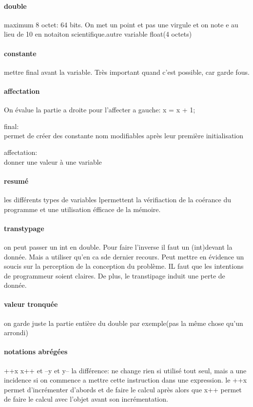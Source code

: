 \documentclass[a4paper,10pt]{article}
\begin{document}
\paragraph{double}
maximum 8 octet: 64 bits. On met un point et pas une virgule et on note e au lieu de 10 en notaiton scientifique.autre variable float(4 octets)
\paragraph{constante}
mettre final avant la variable. Très important quand c'est possible, car garde fous.
\paragraph{affectation}
On évalue la partie a droite pour l'affecter a gauche: x = x + 1;
\begin{description}
 \item final:\\{permet de créer des constante nom modifiables après leur première initialisation}
 \item affectation:\\{donner une valeur à une variable}
\end{description}

\paragraph{resumé}
les différents types de variables lpermettent la vérifiaction de la coérance du programme et une utilisation éfficace de la mémoire.
\paragraph{transtypage}
on peut passer un int en double. Pour faire l'inverse il faut un (int)devant la donnée. Mais a utiliser qu'en ca sde dernier recours.
Peut mettre en évidence un soucis sur la perception de la  conception du problème. IL faut que les intentions de programmeur soient claires. De plus, le transtipage induit une perte de donnée.
\paragraph{valeur tronquée}
on garde juste la partie entière du double par exemple(pas la même chose qu'un arrondi)
\paragraph{notations abrégées}
++x x++ et --y et y-- la différence: ne change rien si utilisé tout seul, mais a une incidence si on commence a mettre cette instruction dans une expression. le ++x permet d'incrémenter d'abords et de faire le calcul après alors que x++ permet de faire le calcul avec l'objet avant son incrémentation.
\end{document}
